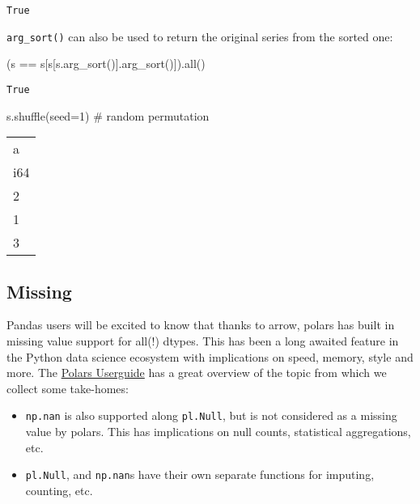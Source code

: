 \documentclass[
  letterpaper,
  DIV=11,
  numbers=noendperiod]{scrartcl}
\newenvironment{Shaded}{\begin{snugshade}}{\end{snugshade}}
\newcommand{\BuiltInTok}[1]{\textcolor[rgb]{0.00,0.23,0.31}{#1}}
\newcommand{\CommentTok}[1]{\textcolor[rgb]{0.37,0.37,0.37}{#1}}
\newcommand{\DecValTok}[1]{\textcolor[rgb]{0.68,0.00,0.00}{#1}}
\newcommand{\NormalTok}[1]{\textcolor[rgb]{0.00,0.23,0.31}{#1}}
\newcommand{\OperatorTok}[1]{\textcolor[rgb]{0.37,0.37,0.37}{#1}}
\providecommand{\tightlist}{%
  \setlength{\itemsep}{0pt}\setlength{\parskip}{0pt}}\usepackage{longtable,booktabs,array}
\begin{document}
\begin{verbatim}
True
\end{verbatim}

\texttt{arg\_sort()} can also be used to return the original series from
the sorted one:

\begin{Shaded}
\begin{Highlighting}[]
\NormalTok{(s }\OperatorTok{==}\NormalTok{ s[s[s.arg\_sort()].arg\_sort()]).}\BuiltInTok{all}\NormalTok{()}
\end{Highlighting}
\end{Shaded}

\begin{verbatim}
True
\end{verbatim}

\begin{Shaded}
\begin{Highlighting}[]
\NormalTok{s.shuffle(seed}\OperatorTok{=}\DecValTok{1}\NormalTok{) }\CommentTok{\# random permutation}
\end{Highlighting}
\end{Shaded}

\begin{longtable}[]{@{}l@{}}
\toprule()
a \\
i64 \\
\midrule()
\endhead
2 \\
1 \\
3 \\
\bottomrule()
\end{longtable}

\hypertarget{missing}{%
\subsection{Missing}\label{missing}}

Pandas users will be excited to know that thanks to arrow, polars has
built in missing value support for all(!) dtypes. This has been a long
awaited feature in the Python data science ecosystem with implications
on speed, memory, style and more. The
\href{https://pola-rs.github.io/polars-book/user-guide/howcani/missing_data.html}{Polars
Userguide} has a great overview of the topic from which we collect some
take-homes:

\begin{itemize}
\tightlist
\item
  \texttt{np.nan} is also supported along \texttt{pl.Null}, but is not
  considered as a missing value by polars. This has implications on null
  counts, statistical aggregations, etc.
\item
  \texttt{pl.Null}, and \texttt{np.nan}s have their own separate
  functions for imputing, counting, etc.
\end{itemize}
\end{document}
